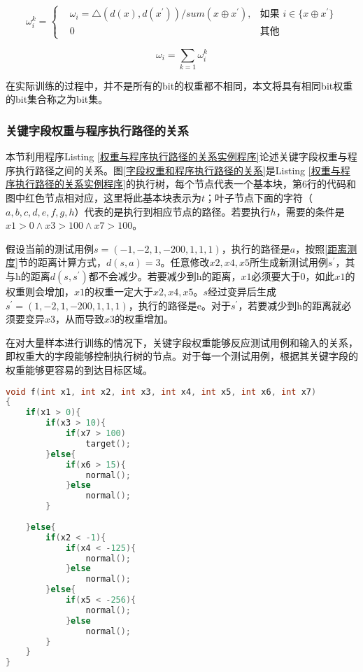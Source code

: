 \begin{equation}\label{bit权重计算}
\omega^{k}_{i}=\left\{
\begin{aligned}
& \omega_{i} = \bigtriangleup (d(x),d(x^{'}))/sum(x \oplus x^{'}), & \text{如果 } i \in \{ x \oplus x^{'} \}\\
& 0 & \text{其他}
\end{aligned}
\right.
\end{equation} 

\begin{equation}\label{bit权重累积}
\omega_{i} = \sum_{k=1} \omega^{k}_{i}
\end{equation}

在实际训练的过程中，并不是所有的bit的权重都不相同，本文将具有相同bit权重的bit集合称之为bit集。

\subsubsection{关键字段权重与程序执行路径的关系}

本节利用程序Listing \ref{权重与程序执行路径的关系实例程序}论述关键字段权重与程序执行路径之间的关系。图\ref{字段权重和程序执行路径的关系}是Listing \ref{权重与程序执行路径的关系实例程序}的执行树，每个节点代表一个基本块，第6行的代码和图中红色节点相对应，这里将此基本块表示为$t$；叶子节点下面的字符（$a,b,c,d,e,f,g,h$）代表的是执行到相应节点的路径。若要执行$h$，需要的条件是$x1>0 \wedge x3>100 \wedge x7>100$。

假设当前的测试用例$s=(-1,-2,1,-200,1,1,1)$，执行的路径是$a$，按照\ref{距离测度}节的距离计算方式，$d(s,a) = 3$。任意修改$x2,x4,x5$所生成新测试用例$s^{'}$，其与h的距离$d(s,s^{'})$都不会减少。若要减少到h的距离，$x1$必须要大于0，如此$x1$的权重则会增加，$x1$的权重一定大于$x2,x4,x5$。$s$经过变异后生成$s^{'}=(1,-2,1,-200,1,1,1)$，执行的路径是e。对于$s^{'}$，若要减少到h的距离就必须要变异$x3$，从而导致$x3$的权重增加。

在对大量样本进行训练的情况下，关键字段权重能够反应测试用例和输入的关系，即权重大的字段能够控制执行树的节点。对于每一个测试用例，根据其关键字段的权重能够更容易的到达目标区域。

\begin{lstlisting}[language=C,caption=权重与程序执行路径的关系实例程序,label=权重与程序执行路径的关系实例程序]
void f(int x1, int x2, int x3, int x4, int x5, int x6, int x7)
{
	if(x1 > 0){
		if(x3 > 10){
			if(x7 > 100)
				target();
		}else{
			if(x6 > 15){
				normal();
			}else
				normal();
		}
			
	}else{
		if(x2 < -1){
			if(x4 < -125){
				normal();
			}else
				normal();
		}else{
			if(x5 < -256){
				normal();
			}else
				normal();
		}
	}
}
\end{lstlisting}

